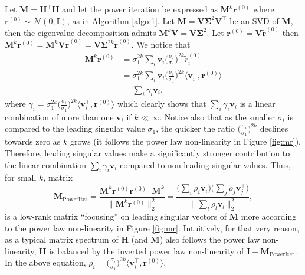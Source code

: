 Let $\mathbf{M}=\mathbf{H}^\top\mathbf{H}$ and let the power iteration be expressed as $\mathbf{M}^k\mathbf{r}^{(0)}$ where $\mathbf{r}^{(0)}\sim\mathcal{N}(0;\mathbf{I})$, as in Algorithm \ref{algo:1}. Let $\mathbf{M}=\mathbf{V}\mathbf{\Sigma}^2\mathbf{V}^\top$ be an SVD of $\mathbf{M}$, then the eigenvalue decomposition admits $\mathbf{M}^{k}\mathbf{V}=\mathbf{V}\mathbf{\Sigma}^2$. Let $\mathbf{r}^{(0)}=\mathbf{V}\widetilde{\mathbf{r}}^{(0)}$ then $\mathbf{M}^{k}\mathbf{r}^{(0)}=\mathbf{M}^{k}\mathbf{V}\widetilde{\mathbf{r}}^{(0)}=\mathbf{V}\mathbf{\Sigma}^{2k}\widetilde{\mathbf{r}}^{(0)}$. We notice that
%
\begin{equation}
\begin{aligned}
    \mathbf{M}^{k}\mathbf{r}^{(0)}&=\sigma_1^{2k}\sum_i \mathbf{v}_i\Big(\frac{\sigma_i}{\sigma_1}\Big)^{2k}\widetilde{{r}}_i^{(0)}\\
  &=\sigma_1^{2k}\sum_i\mathbf{v}_i\Big(\frac{\sigma_i}{\sigma_1}\Big)^{2k} \langle\mathbf{v}_i^\top, \mathbf{r}^{(0)}\rangle\\
  &=\sum_i\gamma_i\mathbf{v}_i,
    \end{aligned}
\end{equation}
%
where $\gamma_i=\sigma_1^{2k}\big(\frac{\sigma_i}{\sigma_1}\big)^{2k} \langle\mathbf{v}_i^\top,\mathbf{r}^{(0)}\rangle$ which clearly shows that $\sum_i\gamma_i\mathbf{v}_i$ is a linear combination of more than one $\mathbf{v}_i$ if $k\ll\infty$. Notice also that as the smaller $\sigma_i$ is compared to the leading singular value $\sigma_1$, the quicker the ratio  $\Big(\frac{\sigma_i}{\sigma_1}\Big)^{2k}$ declines towards zero as $k$ grows (it follows the  power law non-linearity in Figure \ref{fig:mr}). Therefore, leading singular values make a significantly stronger contribution to the linear combination $\sum_i\gamma_i\mathbf{v}_i$ compared to non-leading singular values.
Thus, for small $k$, matrix
\begin{equation}
\mathbf{M}_{\text{PowerIter}}=\frac{\mathbf{M}^{k}\mathbf{r}^{(0)}{\mathbf{r}^{(0)}}^\top\mathbf{M}^{k}}{\lVert \mathbf{M}^{k}\mathbf{r}^{(0)}\rVert_2^2}=\frac{\big(\sum_i\rho_i\mathbf{v}_i\big)\big(\sum_j\rho_j\mathbf{v}_j^\top\big)}{\lVert\sum_l\rho_l\mathbf{v}_l\rVert_2^2},
\end{equation}
%
is a low-rank matrix ``focusing'' on leading singular vectors of $\mathbf{M}$ more according to the power law non-linearity in Figure \ref{fig:mr}. Intuitively, for that very reason, as a typical matrix spectrum of $\mathbf{H}$ (and $\mathbf{M}$) also follows the power law non-linearity, $\mathbf{H}$ is balanced by the inverted power law non-linearity of $\mathbf{I}-\mathbf{M}_{\text{PowerIter}}$.
%
In the above equation, $\rho_i=\big(\frac{\sigma_i}{\sigma_1}\big)^{2k} \langle\mathbf{v}_i^\top,\mathbf{r}^{(0)}\rangle$.

